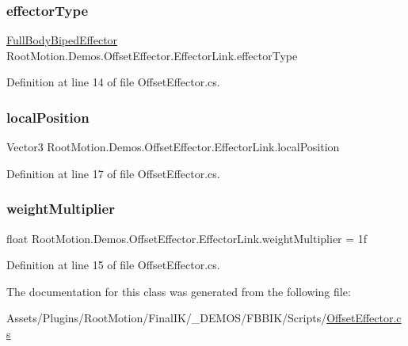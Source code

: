 \subsubsection{\texorpdfstring{effector\+Type}{effectorType}}
{\footnotesize\ttfamily \mbox{\hyperlink{namespace_root_motion_1_1_final_i_k_ae0dd2058c7667b6f132c11a6b860c14a}{Full\+Body\+Biped\+Effector}} Root\+Motion.\+Demos.\+Offset\+Effector.\+Effector\+Link.\+effector\+Type}



Definition at line 14 of file Offset\+Effector.\+cs.

\mbox{\label{class_root_motion_1_1_demos_1_1_offset_effector_1_1_effector_link_a3c689aa0dbe3d763c7190651886acbf2}} 
\subsubsection{\texorpdfstring{local\+Position}{localPosition}}
{\footnotesize\ttfamily Vector3 Root\+Motion.\+Demos.\+Offset\+Effector.\+Effector\+Link.\+local\+Position}



Definition at line 17 of file Offset\+Effector.\+cs.

\mbox{\label{class_root_motion_1_1_demos_1_1_offset_effector_1_1_effector_link_a60299be7c6de08ea7c8e805d66354729}} 
\subsubsection{\texorpdfstring{weight\+Multiplier}{weightMultiplier}}
{\footnotesize\ttfamily float Root\+Motion.\+Demos.\+Offset\+Effector.\+Effector\+Link.\+weight\+Multiplier = 1f}



Definition at line 15 of file Offset\+Effector.\+cs.



The documentation for this class was generated from the following file\+:\begin{DoxyCompactItemize}
\item 
Assets/\+Plugins/\+Root\+Motion/\+Final\+I\+K/\+\_\+\+D\+E\+M\+O\+S/\+F\+B\+B\+I\+K/\+Scripts/\mbox{\hyperlink{_offset_effector_8cs}{Offset\+Effector.\+cs}}\end{DoxyCompactItemize}
